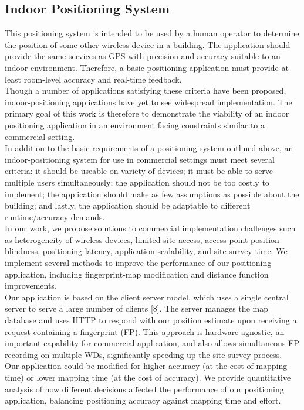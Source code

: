 \documentclass[twoside]{article}
\begin{document}
\begin{multicols}{2}

\section{Indoor Positioning System}

\indent This positioning system is intended to be used by a human operator to determine the position of some other wireless device in a building. The application should provide the same services as GPS with precision and accuracy suitable to an indoor environment. Therefore, a basic positioning application must provide at least room-level accuracy and real-time feedback.\\
\indent Though a number of applications satisfying these criteria have been proposed, indoor-positioning applications have yet to see widespread implementation. The primary goal of this work is therefore to demonstrate the viability of an indoor positioning application in an environment facing constraints similar to a commercial setting. \\
\indent In addition to the basic requirements of a positioning system outlined above, an indoor-positioning system for use in commercial settings must meet several criteria: it should be useable on variety of devices; it must be able to serve multiple users simultaneously; the application should not be too costly to implement; the application should make as few assumptions as possible about the building; and lastly, the application should be adaptable to different runtime/accuracy demands.\\
\indent In our work, we propose solutions to commercial implementation challenges such as heterogeneity of wireless devices, limited site-access, access point position blindness, positioning latency, application scalability, and site-survey time. We implement several methods to improve the performance of our positioning application, including fingerprint-map modification and distance function improvements. \\
\indent Our application is based on the client server model, which uses a single central server to serve a large number of clients [8]. The server manages the map database and uses HTTP to respond with our position estimate upon receiving a request containing a fingerprint (FP). This approach is hardware-agnostic, an important capability for commercial application, and also allows simultaneous FP recording on multiple WDs, significantly speeding up the site-survey process. \\
\indent Our application could be modified for higher accuracy (at the cost of mapping time) or lower mapping time (at the cost of accuracy). We provide quantitative analysis of how different decisions affected the performance of our positioning application, balancing positioning accuracy against mapping time and effort. 


\end{multicols}
\end{document}
